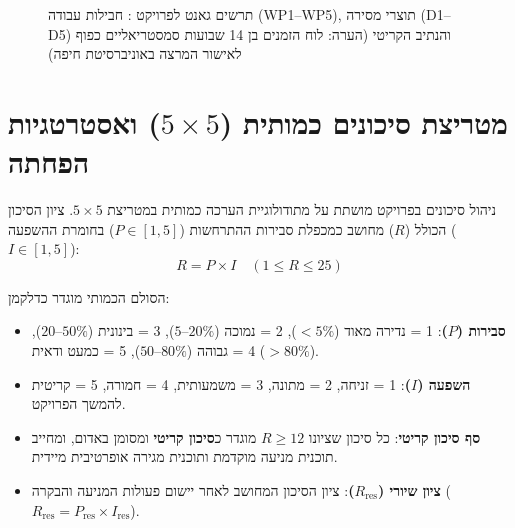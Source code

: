\begin{figure}[H]
\begin{LTR}
\end{LTR}
\caption{תרשים גאנט לפרויקט \projectname{}: חבילות עבודה (WP1--WP5), תוצרי מסירה (D1--D5) והנתיב הקריטי (הערה: לוח הזמנים בן 14 שבועות סמסטריאליים כפוף לאישור המרצה באוניברסיטת חיפה)}
\label{fig:project_gantt_chart}
\end{figure}

\section{מטריצת סיכונים כמותית ($5 \times 5$) ואסטרטגיות הפחתה}
\label{sec:impl_risk_matrix}
ניהול סיכונים בפרויקט \projectname{} מושתת על מתודולוגיית הערכה כמותית במטריצת $5 \times 5$. ציון הסיכון הכולל ($R$) מחושב כמכפלת סבירות ההתרחשות ($P \in [1, 5]$) בחומרת ההשפעה ($I \in [1, 5]$):
\begin{equation}
    R = P \times I \quad (1 \le R \le 25)
\end{equation}

הסולם הכמותי מוגדר כדלקמן:
\begin{itemize}
    \item \textbf{סבירות ($P$)}: 1 = נדירה מאוד ($<5\%$), 2 = נמוכה ($5\text{--}20\%$), 3 = בינונית ($20\text{--}50\%$), 4 = גבוהה ($50\text{--}80\%$), 5 = כמעט ודאית ($>80\%$).
    \item \textbf{השפעה ($I$)}: 1 = זניחה, 2 = מתונה, 3 = משמעותית, 4 = חמורה, 5 = קריטית להמשך הפרויקט.
    \item \textbf{סף סיכון קריטי}: כל סיכון שציונו $R \ge 12$ מוגדר כ\textbf{סיכון קריטי} ומסומן באדום, ומחייב תוכנית מניעה מוקדמת ותוכנית מגירה אופרטיבית מיידית.
    \item \textbf{ציון שיורי ($R_{\text{res}}$)}: ציון הסיכון המחושב לאחר יישום פעולות המניעה והבקרה ($R_{\text{res}} = P_{\text{res}} \times I_{\text{res}}$).
\end{itemize}

